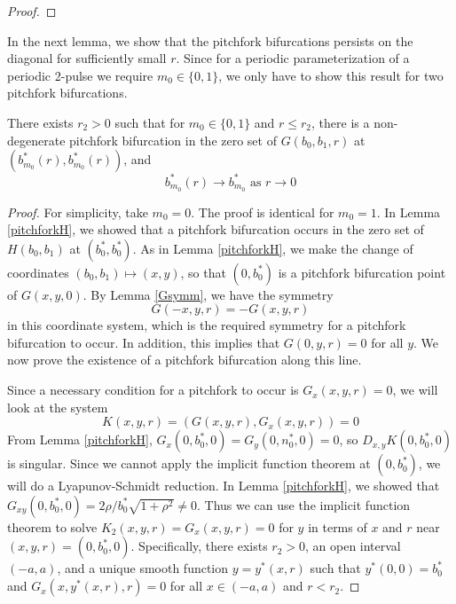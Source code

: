 \documentclass[thesis.tex]{subfiles}
\begin{document}
\begin{lemma}
\begin{proof}
\end{proof}
\end{lemma}

In the next lemma, we show that the pitchfork bifurcations persists on the diagonal for sufficiently small $r$. Since for a periodic parameterization of a periodic 2-pulse we require $m_0 \in \{0, 1\}$, we only have to show this result for two pitchfork bifurcations.


\begin{lemma}\label{pitchpersist}
There exists $r_2 > 0$ such that for $m_0 \in \{0, 1\}$ and $r \leq r_2$, there is a non-degenerate pitchfork bifurcation in the zero set of $G(b_0, b_1, r)$ at $(b_{m_0}^*(r),b_{m_0}^*(r))$, and 
\begin{equation*}
b_{m_0}^*(r) \rightarrow b_{m_0}^* \text{ as } r \rightarrow 0
\end{equation*}
\begin{proof}
For simplicity, take $m_0 = 0$. The proof is identical for $m_0 =1$. In Lemma \ref{pitchforkH}, we showed that a pitchfork bifurcation occurs in the zero set of $H(b_0, b_1)$ at $(b_0^*, b_0^*)$. As in Lemma \ref{pitchforkH}, we make the change of coordinates $(b_0, b_1) \mapsto (x, y)$, so that $(0, b_0^*)$ is a pitchfork bifurcation point of $G(x, y, 0)$. By Lemma \ref{Gsymm}, we have the symmetry 
\[
G(-x, y, r) = -G(x, y, r)
\]
in this coordinate system, which is the required symmetry for a pitchfork bifurcation to occur. In addition, this implies that $G(0, y, r) = 0$ for all $y$. We now prove the existence of a pitchfork bifurcation along this line. 

Since a necessary condition for a pitchfork to occur is $G_x(x, y, r) = 0$, we will look at the system
\begin{equation*}
K(x,y,r) = (G(x,y,r), G_x(x,y,r)) = 0
\end{equation*}
From Lemma \ref{pitchforkH}, $G_x(0,b_0^*,0) = G_y(0, n_0^*, 0) = 0$, so $D_{x,y}K(0,b_0^*,0)$ is singular. Since we cannot apply the implicit function theorem at $(0, b_0^*)$, we will do a Lyapunov-Schmidt reduction. In Lemma \ref{pitchforkH}, we showed that $G_{xy}(0, b_0^*, 0) = 2 \rho/b_0^* \sqrt{1 + \rho^2} \neq 0$. Thus we can use the implicit function theorem to solve $K_2(x,y,r) = G_x(x,y,r) = 0$ for $y$ in terms of $x$ and $r$ near $(x,y,r) = (0, b_0^*, 0)$. Specifically, there exists $r_2 > 0$, an open interval $(-a, a)$, and a unique smooth function $y = y^*(x, r)$ such that $y^*(0, 0) = b_0^*$ and $G_x(x, y^*(x, r), r) = 0$ for all $x \in (-a, a)$ and $r < r_2$.


\end{proof}
\end{lemma}
\end{document}

